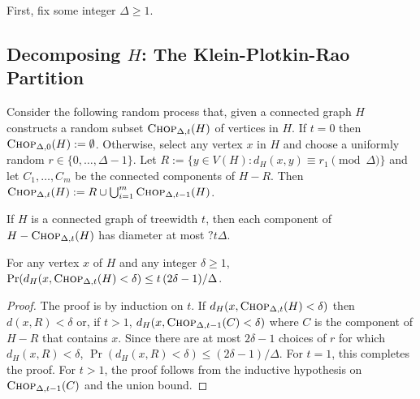 \documentclass{patmorin}
\newcommand{\defin}[1]{\emph{\textcolor{brightmaroon}{#1}}}
\begin{document}
First, fix some integer $\Delta \ge 1$.

\subsection{Decomposing $H$: The Klein-Plotkin-Rao Partition}

Consider the following random process that, given a connected graph $H$ constructs a random subset $\textsc{Chop}_{\Delta,t}(H)$ of vertices in $H$. If $t=0$ then $\textsc{Chop}_{\Delta,0}(H):=\emptyset$.  Otherwise, select any vertex $x$ in $H$ and choose a uniformly random $r\in\{0,\ldots,\Delta-1\}$.  Let $R:=\{y\in V(H):d_{H}(x,y)\equiv r_1\pmod{\Delta}\}$ and let $C_1,\ldots,C_m$ be the connected components of $H-R$.  Then $\textsc{Chop}_{\Delta,t}(H):=R\cup\bigcup_{i=1}^m \textsc{Chop}_{\Delta,t-1}(H)$.

\begin{lem}\label{component_diameter_h}
  If $H$ is a connected graph of treewidth $t$, then each component of $H-\textsc{Chop}_{\Delta,t}(H)$ has diameter at most $?t\Delta$.
\end{lem}



\begin{lem}\label{delta_bad_h}
  For any vertex $x$ of $H$ and any integer $\delta\ge 1$, $\Pr(d_H(x, \textsc{Chop}_{\Delta,t}(H)< \delta)\le t\,(2\delta-1)/\Delta$.
\end{lem}

\begin{proof}
  The proof is by induction on $t$.
  If $d_H(x,\textsc{Chop}_{\Delta,t}(H) < \delta)$ then $d(x,R)< \delta$ or, if $t>1$,  $d_H(x,\textsc{Chop}_{\Delta,t-1}(C) < \delta)$ where $C$ is the component of $H-R$ that contains $x$.  Since there are at most $2\delta-1$ choices of $r$ for which $d_H(x,R)<\delta$, $\Pr(d_H(x,R)<\delta) \le (2\delta-1)/\Delta$. For $t=1$, this completes the proof.  For $t>1$, the proof follows from the inductive hypothesis on $\textsc{Chop}_{\Delta,t-1}(C)$ and the union bound.
\end{proof}

%
\end{document}
